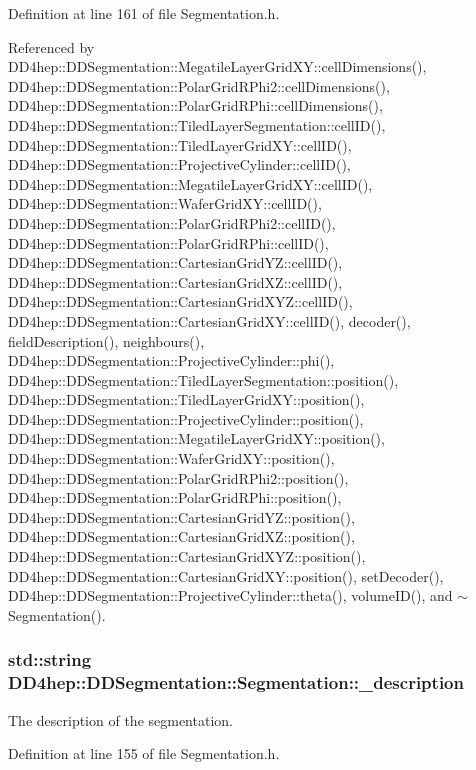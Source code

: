 Definition at line 161 of file Segmentation.h.

Referenced by DD4hep::DDSegmentation::MegatileLayerGridXY::cellDimensions(), DD4hep::DDSegmentation::PolarGridRPhi2::cellDimensions(), DD4hep::DDSegmentation::PolarGridRPhi::cellDimensions(), DD4hep::DDSegmentation::TiledLayerSegmentation::cellID(), DD4hep::DDSegmentation::TiledLayerGridXY::cellID(), DD4hep::DDSegmentation::ProjectiveCylinder::cellID(), DD4hep::DDSegmentation::MegatileLayerGridXY::cellID(), DD4hep::DDSegmentation::WaferGridXY::cellID(), DD4hep::DDSegmentation::PolarGridRPhi2::cellID(), DD4hep::DDSegmentation::PolarGridRPhi::cellID(), DD4hep::DDSegmentation::CartesianGridYZ::cellID(), DD4hep::DDSegmentation::CartesianGridXZ::cellID(), DD4hep::DDSegmentation::CartesianGridXYZ::cellID(), DD4hep::DDSegmentation::CartesianGridXY::cellID(), decoder(), fieldDescription(), neighbours(), DD4hep::DDSegmentation::ProjectiveCylinder::phi(), DD4hep::DDSegmentation::TiledLayerSegmentation::position(), DD4hep::DDSegmentation::TiledLayerGridXY::position(), DD4hep::DDSegmentation::ProjectiveCylinder::position(), DD4hep::DDSegmentation::MegatileLayerGridXY::position(), DD4hep::DDSegmentation::WaferGridXY::position(), DD4hep::DDSegmentation::PolarGridRPhi2::position(), DD4hep::DDSegmentation::PolarGridRPhi::position(), DD4hep::DDSegmentation::CartesianGridYZ::position(), DD4hep::DDSegmentation::CartesianGridXZ::position(), DD4hep::DDSegmentation::CartesianGridXYZ::position(), DD4hep::DDSegmentation::CartesianGridXY::position(), setDecoder(), DD4hep::DDSegmentation::ProjectiveCylinder::theta(), volumeID(), and $\sim$Segmentation().\hypertarget{class_d_d4hep_1_1_d_d_segmentation_1_1_segmentation_a1e9aa1272b32dc4999584154baa72a14}{
\subsubsection[{\_\-description}]{\setlength{\rightskip}{0pt plus 5cm}std::string {\bf DD4hep::DDSegmentation::Segmentation::\_\-description}}}
\label{class_d_d4hep_1_1_d_d_segmentation_1_1_segmentation_a1e9aa1272b32dc4999584154baa72a14}


The description of the segmentation. 

Definition at line 155 of file Segmentation.h.

